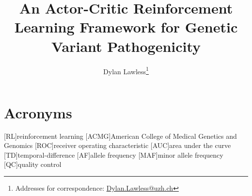 
\usepackage[printonlyused,withpage,nohyperlinks]{acronym}

\newcommand{\boxlabel}[1]{%
  \refstepcounter{myboxcounter}%
  \label{#1}%
}

\title{An Actor-Critic Reinforcement Learning Framework for Genetic Variant Pathogenicity}

\author[1]{Dylan Lawless\thanks{Addresses for correspondence: \href{mailto:Dylan.Lawless@uzh.ch}{Dylan.Lawless@uzh.ch}}}

\maketitle
\justify

\section*{Acronyms}
\renewenvironment{description} %
{\list{}{\labelwidth0pt\itemindent-\leftmargin
    \parsep-1em\itemsep0pt\let\makelabel\descriptionlabel}}
               {\endlist}
\begin{acronym} 
[RL]{reinforcement learning}
[ACMG]{American College of Medical Genetics and Genomics}
[ROC]{receiver operating characteristic}
[AUC]{area under the curve}
[TD]{temporal-difference}
[AF]{allele frequency}
[MAF]{minor allele frequency}
[QC]{quality control}
\end{acronym}
\clearpage
 
